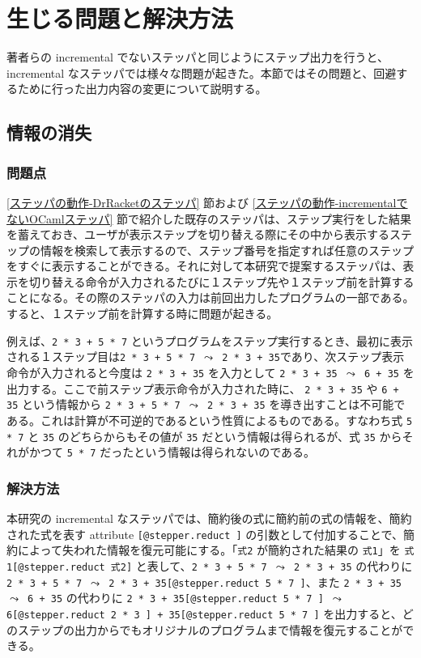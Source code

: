 \section{生じる問題と解決方法}
\label{生じる問題と解決方法}

著者らの incremental でないステッパ\cite{FCA19}と同じようにステップ出力を行うと、incremental なステッパでは様々な問題が起きた。本節ではその問題と、回避するために行った出力内容の変更について説明する。

\subsection{情報の消失}
\label{生じる問題と解決方法-情報の消失}
\subsubsection{問題点}
\label{生じる問題と解決方法-情報の消失-問題点}
\ref{ステッパの動作-DrRacketのステッパ} 節および \ref{ステッパの動作-incrementalでないOCamlステッパ} 節で紹介した既存のステッパは、ステップ実行をした結果を蓄えておき、ユーザが表示ステップを切り替える際にその中から表示するステップの情報を検索して表示するので、ステップ番号を指定すれば任意のステップをすぐに表示することができる。それに対して本研究で提案するステッパは、表示を切り替える命令が入力されるたびに１ステップ先や１ステップ前を計算することになる。その際のステッパの入力は前回出力したプログラムの一部である。すると、１ステップ前を計算する時に問題が起きる。

例えば、\texttt{2 * 3 + 5 * 7} というプログラムをステップ実行するとき、最初に表示される１ステップ目は\texttt{2 * 3 + 5 * 7 $\leadsto$ 2 * 3 + 35}であり、次ステップ表示命令が入力されると今度は \texttt{2 * 3 + 35} を入力として \texttt{2 * 3 + 35 $\leadsto$ 6 + 35} を出力する。ここで前ステップ表示命令が入力された時に、 \texttt{2 * 3 + 35} や \texttt{6 + 35} という情報から \texttt{2 * 3 + 5 * 7 $\leadsto$ 2 * 3 + 35} を導き出すことは不可能である。これは計算が不可逆的であるという性質によるものである。すなわち式 \texttt{5 * 7} と \texttt{35} のどちらからもその値が \texttt{35} だという情報は得られるが、式 \texttt{35} からそれがかつて \texttt{5 * 7} だったという情報は得られないのである。

\subsubsection{解決方法}
\label{生じる問題と解決方法-情報の消失-解決方法}

本研究の incremental なステッパでは、簡約後の式に簡約前の式の情報を、簡約された式を表す attribute \texttt{[@stepper.reduct ]} の引数として付加することで、簡約によって失われた情報を復元可能にする。「\texttt{式2} が簡約された結果の \texttt{式1}」を \texttt{式1[@stepper.reduct 式2]} と表して、\texttt{2 * 3 + 5 * 7 $\leadsto$ 2 * 3 + 35} の代わりに \texttt{2 * 3 + 5 * 7 $\leadsto$ 2 * 3 + 35[@stepper.reduct 5 * 7 ]}、また \texttt{2 * 3 + 35 $\leadsto$ 6 + 35} の代わりに \texttt{2 * 3 + 35[@stepper.reduct 5 * 7 ] $\leadsto$ 6[@stepper.reduct 2 * 3 ] + 35[@stepper.reduct 5 * 7 ]} を出力すると、どのステップの出力からでもオリジナルのプログラムまで情報を復元することができる。

